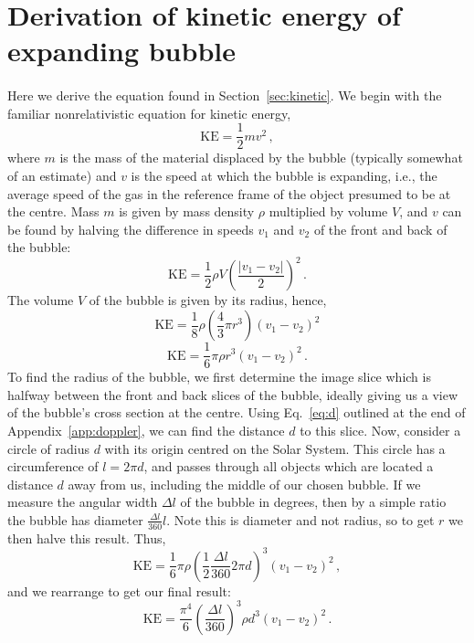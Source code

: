 \documentclass[a4paper, titlepage, oneside]{article}
\begin{document}
\section{Derivation of kinetic energy of expanding bubble}
\label{app:kinetic}
\paragraph{}
Here we derive the equation found in Section~\ref{sec:kinetic}. We begin with the familiar nonrelativistic equation for kinetic energy,
\begin{equation}
  \mathrm{KE} = \frac{1}{2} m v ^ 2 \, ,
\end{equation}
where \(m\) is the mass of the material displaced by the bubble (typically somewhat of an estimate) and \(v\) is the speed at which the bubble is expanding, i.e., the average speed of the gas in the reference frame of the object presumed to be at the centre. Mass \(m\) is given by mass density \(\rho\) multiplied by volume \(V\), and \(v\) can be found by halving the difference in speeds \(v_1\) and \(v_2\) of the front and back of the bubble:
\begin{equation}
  \mathrm{KE} = \frac{1}{2} \rho V { \left( \frac{\lvert v_1 - v_2 \rvert}{2} \right) }^2 \, .
\end{equation}
The volume \(V\) of the bubble is given by its radius, hence,
\begin{equation}
  \mathrm{KE} = \frac{1}{8} \rho \left( \frac{4}{3}\pi r^3 \right) {(v_1 - v_2)}^2
\end{equation} \begin{equation}
  \mathrm{KE} = \frac{1}{6} \pi \rho r^3 {(v_1 - v_2)}^2  \, .
\end{equation}
To find the radius of the bubble, we first determine the image slice which is halfway between the front and back slices of the bubble, ideally giving us a view of the bubble's cross section at the centre. Using Eq.~\ref{eq:d} outlined at the end of Appendix~\ref{app:doppler}, we can find the distance \(d\) to this slice. Now, consider a circle of radius \(d\) with its origin centred on the Solar System. This circle has a circumference of \(l = 2 \pi d\), and passes through all objects which are located a distance \(d\) away from us, including the middle of our chosen bubble. If we measure the angular width \(\Delta l\) of the bubble in degrees, then by a simple ratio the bubble has diameter \(\frac{\Delta l}{360}l\). Note this is diameter and not radius, so to get \(r\) we then halve this result. Thus,
\begin{equation}
  \mathrm{KE} = \frac{1}{6} \pi \rho {\left( \frac{1}{2} \frac{\Delta l}{360} 2 \pi d \right)}^3 {(v_1 - v_2)}^2  \, ,
\end{equation}
and we rearrange to get our final result:
\begin{equation}
  \mathrm{KE} = \frac{\pi ^ 4}{6} {\left( \frac{\Delta l}{360} \right)}^3 \rho d^3 {(v_1 - v_2)}^2 \, .
\end{equation}
\end{document}
